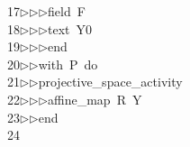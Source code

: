 \begin{tabbing}
17\>$\triangleright$\>$\triangleright$\>$\triangleright$\>field\ F\ \\[0pt]
18\>$\triangleright$\>$\triangleright$\>$\triangleright$\>text\ Y0\ \\[0pt]
19\>$\triangleright$\>$\triangleright$\>$\triangleright$\>end\ \\[0pt]
20\>$\triangleright$\>$\triangleright$\>with\ P\ do\ \\[0pt]
21\>$\triangleright$\>$\triangleright$\>projective\_space\_activity\ \\[0pt]
22\>$\triangleright$\>$\triangleright$\>$\triangleright$\>affine\_map\ R\ Y\ \ \\[0pt]
23\>$\triangleright$\>$\triangleright$\>end\\[0pt]
24\>\end{tabbing}
